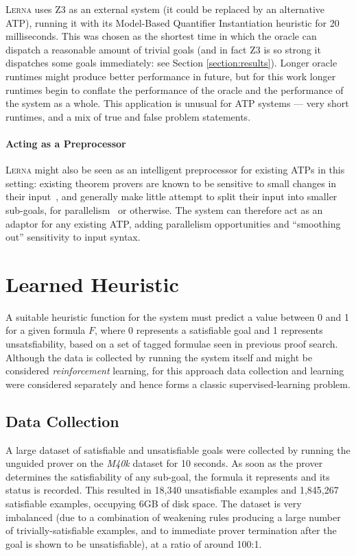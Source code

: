 \documentclass{llncs}
\newcommand{\lerna}{\textsc{Lerna}}
\newcommand{\z}[1]{\textsc{Z3}}
\newcommand{\mizarlarge}{\textit{M40k}}
\begin{document}
\lerna{} uses \z3{} as an external system (it could be replaced by an alternative ATP), running it with its Model-Based Quantifier Instantiation heuristic for 20 milliseconds. 
%
This was chosen as the shortest time in which the oracle can dispatch a reasonable amount of trivial goals (and in fact \z3{} is so strong it dispatches some goals immediately: see Section \ref{section:results}).
Longer oracle runtimes might produce better performance in future, but for this work longer runtimes begin to conflate the performance of the oracle and the performance of the system as a whole.
This application is unusual for ATP systems --- very short runtimes, and a mix of true and false problem statements.

\paragraph{Acting as a Preprocessor}
\lerna{} might also be seen as an intelligent preprocessor for existing ATPs in this setting: existing theorem provers are known to be sensitive to small changes in their input~\cite{clausification}, and generally make little attempt to split their input into smaller sub-goals, for parallelism~\cite{parallel} or otherwise.
The system can therefore act as an adaptor for any existing ATP, adding parallelism opportunities and ``smoothing out'' sensitivity to input syntax.

\section{Learned Heuristic}
\label{section:heuristic}
A suitable heuristic function for the system must predict a value between 0 and 1 for a given formula \(F\), where 0 represents a satisfiable goal and 1 represents unsatsfiability, based on a set of tagged formulae seen in previous proof search.
Although the data is collected by running the system itself and might be considered \emph{reinforcement} learning, for this approach data collection and learning were considered separately and hence forms a classic supervised-learning problem.

\subsection{Data Collection}
A large dataset of satisfiable and unsatisfiable goals were collected by running the unguided prover on the \mizarlarge{} dataset for 10 seconds.
As soon as the prover determines the satisfiability of any sub-goal, the formula it represents and its status is recorded.
This resulted in 18,340 unsatisfiable examples and 1,845,267 satisfiable examples, occupying 6GB of disk space.
The dataset is very imbalanced (due to a combination of weakening rules producing a large number of trivially-satisfiable examples, and to immediate prover termination after the goal is shown to be unsatisfiable), at a ratio of around 100:1.
\end{document}
